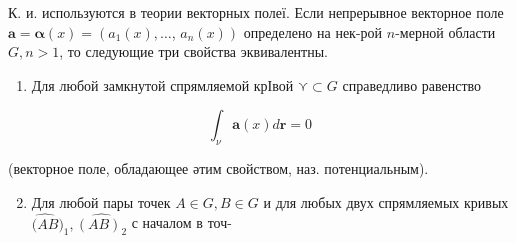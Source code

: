 \documentclass[10pt]{article}
\begin{document}
К. и. используются в теории векторных полеї. Если непрерывное векторное поле $\boldsymbol{a}=\boldsymbol{\alpha}(x)=\left(a_{1}(x), \ldots\right.$, $\left.a_{n}(x)\right)$ определено на нек-рой $n$-мерной области $G, n>1$, то следующие три свойства эквивалентны.



\begin{enumerate}

  \item Для любой замкнутой спрямляемой крІвой $\curlyvee \subset G$ справедливо равенство

\end{enumerate}



\[

\int_{\nu} \boldsymbol{a}(x) d \boldsymbol{r}=0

\]



(векторное поле, обладающее әтим свойством, наз. потенциальным).



\begin{enumerate}

  \setcounter{enumi}{1}

  \item Для любой пары точек $A \in G, B \in G$ и для любых двух спрямляемых кривых $\widehat{(A B})_{1}, \widehat{(A B)_{2}}$ с началом в точ-

\end{enumerate}
\end{document}
